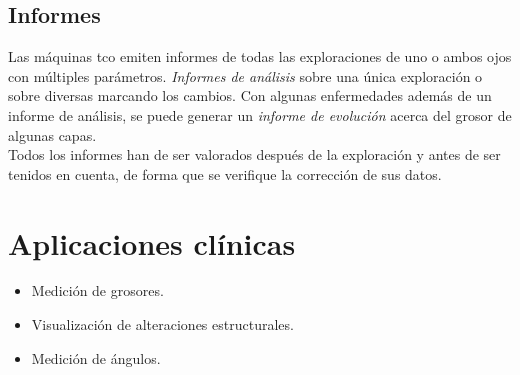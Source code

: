 \subsection{Informes}
Las máquinas \gls{tco} emiten informes de todas las exploraciones de
uno o ambos ojos con múltiples parámetros. \emph{Informes de análisis}
sobre una única exploración o sobre diversas marcando los cambios. Con
algunas enfermedades además de un informe de análisis, se puede
generar un \emph{informe de evolución} acerca del grosor de algunas
capas.\\
Todos los informes han de ser valorados después de la exploración
y antes de ser tenidos en cuenta, de forma que se verifique la
corrección de sus datos.

\section{Aplicaciones clínicas}
\begin{itemize}
\item Medición de grosores.
\item Visualización de alteraciones estructurales.
\item Medición de ángulos.
\end{itemize}